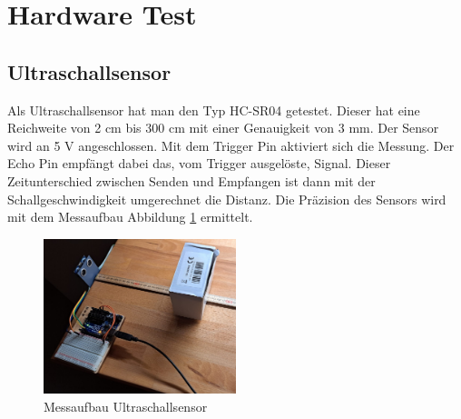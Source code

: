 \newpage
\section{Hardware Test}

\subsection{Ultraschallsensor}
Als Ultraschallsensor hat man den Typ HC-SR04 getestet. Dieser hat eine Reichweite von 2 cm bis 300 cm mit einer Genauigkeit von 3 mm. Der Sensor wird an 5 V angeschlossen. Mit dem Trigger Pin aktiviert sich die Messung. Der Echo Pin empfängt dabei das, vom Trigger ausgelöste, Signal. Dieser Zeitunterschied zwischen Senden und Empfangen ist dann mit der Schallgeschwindigkeit umgerechnet die Distanz. Die Präzision des Sensors wird mit dem Messaufbau Abbildung \ref{fig:Ultraschall1} ermittelt.

\begin{figure}[h] %
    \centering
    \includegraphics[width=0.5\textwidth]{img/sensortest/MA_Ultraschall.jpg} %
    \caption{Messaufbau Ultraschallsensor}
    \label{fig:Ultraschall1} %
\end{figure}

